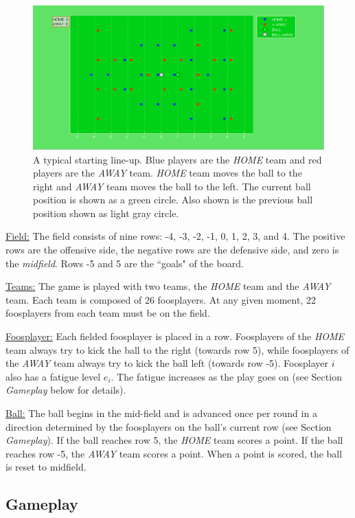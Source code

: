 \documentclass[12pt,letterpaper,twoside]{article}
\newcommand{\subproblem}[1]{\phantomsection\addcontentsline{toc}{subsection}{#1}\subsection*{#1}}
\begin{document}
\begin{figure}[h!]
\begin{center}
\includegraphics[width=.8\textwidth]{Setup0.pdf} 
\caption{\label{fig:setup} A typical starting line-up. Blue players are the {\em HOME} team and red players are the {\em AWAY} team. {\em HOME} team moves the ball to the right and {\em AWAY} team moves the ball to the left. The current ball position is shown as a green circle. Also shown is the previous ball position shown as light gray circle.}
\end{center}
\end{figure}

\underline{Field:} The field consists of nine rows: -4, -3, -2, -1, 0, 1, 2, 3, and 4. The positive rows are the offensive side, the negative rows are the defensive side, and zero is the {\em midfield}. Rows -5 and 5 are the ``goals" of the board.

\underline{Teams:} The game is played with two teams, the {\em HOME} team and the {\em AWAY} team. Each team is composed of 26 foosplayers. At any given moment, 22 foosplayers from each team must be on the field.

\underline{Foosplayer:} Each fielded foosplayer is placed in a row. Foosplayers of the {\em HOME} team always try to kick the ball to the right (towards row 5), while foosplayers of the {\em AWAY} team always try to kick the ball left (towards row -5). Foosplayer $i$ also has a fatigue level $e_i$. The fatigue increases as the play goes on (see Section {\em Gameplay} below for details).

\underline{Ball:} The ball begins in the mid-field and is advanced once per round in a direction determined by the foosplayers on the ball's current row (see Section {\em Gameplay}). If the ball reaches row 5, the {\em HOME} team scores a point. If the ball reaches row -5, the {\em AWAY} team scores a point. When a point is scored, the ball is reset to midfield. 


\newpage 
\subproblem{Gameplay}
\end{document}
